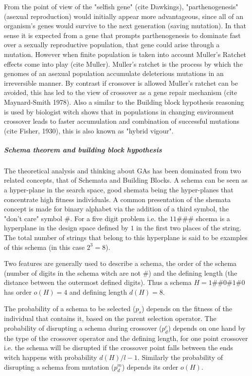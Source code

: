 From the point of view of the "selfish gene" (cite Dawkings), "parthenogenesis" (asexual reproduction) would initially appear more advantageous, since all of an organism's genes would survive to the next generation (saving mutation). In that sense it is expected from a gene that prompts parthenogenesis to dominate fast over a sexually reproductive population, that gene could arise through a mutation. However when finite population is taken into account Muller's Ratchet effects come into play (cite Muller). Muller's ratchet is the process by which the genomes of an asexual population accumulate deleterious mutations in an irreversible manner. By contrast if crossover is allowed Muller's ratchet can be avoided, this has led to the view of crossover as a gene repair mechanism (cite Maynard-Smith 1978). Also a similar to the Building block hypothesis reasoning is used by biologist witch shows that in populations in changing environment crossover leads to faster accumulation and combination of successful mutations (cite Fisher, 1930), this is also known as "hybrid vigour".            

\subparagraph{Schema theorem and building block hypothesis}
The theoretical analysis and thinking about GAs has been dominated from two related concepts, that of Schemata and Building Blocks. A schema can be seen as a hyper-plane in the search space, good shemata being the hyper-planes that concentrate high fitness individuals. A common presentation of the shemata concept is made for binary alphabet via the addition of a third symbol, the "don't care" symbol $\#$. For a five digit problem i.e. the $11\#\#\#$ shcema is a hyperplane in the design space defined by $1$ in the first two places of the string. The total number of strings that belong to this hyperplane is said to be examples of this schema (in this case $2^3 = 8$). 

Two features are generally used to describe a schema, the order of the schema (number of digits in the schema witch are not $\#$) and the defining length (the distance between the outermost defined digits). Thus a schema $H=1\#\#0\#1\#0$  has order $o(H)=4$ and defining length $d(H)=8$.

The probability of a schema to be selected ($p_s$) depends on the fitness of the individual that contains it, based on the parent selection operator. The probability of disrupting a schema during crossover ($p_d^c$) depends on one hand by the type of the crossover operator and the defining length, for one point crossover i.e. the schema will be disrupted if the crossover point falls between the ends witch happens with probability $ d(H)/l-1 $. Similarly the probability of disrupting a schema from mutation ($p_d^m$) depends its order  $o(H)$.

